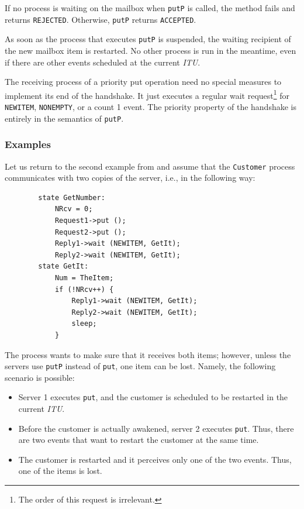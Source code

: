 If no process is waiting on the mailbox when {\tt putP} is called,
the method fails and returns {\tt REJECTED}.
Otherwise, {\tt putP} returns {\tt ACCEPTED}.

As soon as the process that executes {\tt putP} is suspended, the
waiting recipient of the new mailbox item is restarted.
No other process is run
in the meantime, even if there are other events scheduled at the current
{\em ITU}.

The receiving process of a priority put operation need no
special measures to implement its end of the handshake.
It just executes a regular wait request\footnote{The order of this request
is irrelevant.} for {\tt NEWITEM}, {\tt NONEMPTY}, or a count 1 event.
The priority property of the handshake is entirely in the semantics of
{\tt putP}.

\subsubsection*{Examples}

\noindent
Let us return to the second example from  and assume that
the {\tt Customer} process communicates with two copies of
the server, i.e., in the following way:
\begin{verbatim}
        state GetNumber:
            NRcv = 0;
            Request1->put ();
            Request2->put ();
            Reply1->wait (NEWITEM, GetIt);
            Reply2->wait (NEWITEM, GetIt);
        state GetIt:
            Num = TheItem;
            if (!NRcv++) {
                Reply1->wait (NEWITEM, GetIt);
                Reply2->wait (NEWITEM, GetIt);
                sleep;
            }
\end{verbatim}

The process wants to make sure that it receives both items; however,
unless the servers use {\tt putP} instead of {\tt put}, one item
can be lost.
Namely, the following scenario is possible:
\begin{itemize}
\item
Server 1 executes {\tt put}, and the customer is scheduled to be restarted
in the current {\em ITU}.
\item
Before the customer is actually awakened, server 2 executes {\tt put}.
Thus, there are two events that want to restart the customer at the same
time.
\item
The customer is restarted and it perceives only one of the two events.
Thus, one of the items is lost.
\end{itemize}

